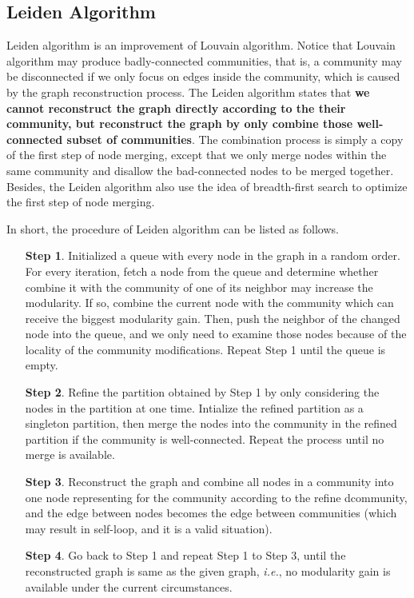 \documentclass[12pt, a4paper]{article}
\theoremstyle{definition}
\begin{document}
\subsection{Leiden Algorithm}
Leiden algorithm is an improvement of Louvain algorithm. Notice that Louvain algorithm may produce badly-connected communities, that is, a community may be disconnected if we only focus on edges inside the community, which is caused by the graph reconstruction process. The Leiden algorithm states that \textbf{we cannot reconstruct the graph directly according to the their community, but reconstruct the graph by only combine those well-connected subset of communities}. The combination process is simply a copy of the first step of node merging, except that we only merge nodes within the same community and disallow the bad-connected nodes to be merged together. Besides, the Leiden algorithm also use the idea of breadth-first search to optimize the first step of node merging.

In short, the procedure of Leiden algorithm can be listed as follows.

\begin{enumerate}
	\item[\textbf{Step 1}.] Initialized a queue with every node in the graph in a random order. For every iteration, fetch a node from the queue and determine whether combine it with the community of one of its neighbor may increase the modularity. If so, combine the current node with the community which can receive the biggest modularity gain. Then, push the neighbor of the changed node into the queue, and we only need to examine those nodes because of the locality of the community modifications. Repeat Step 1 until the queue is empty.
	\item[\textbf{Step 2}.] Refine the partition obtained by Step 1 by only considering the nodes in the partition at one time. Intialize the refined partition as a singleton partition, then merge the nodes into the community in the refined partition if the community is well-connected. Repeat the process until no merge is available.
	\item[\textbf{Step 3}.] Reconstruct the graph and combine all nodes in a community into one node representing for the community according to the refine dcommunity, and the edge between nodes becomes the edge between communities (which may result in self-loop, and it is a valid situation).
	\item[\textbf{Step 4}.] Go back to Step 1 and repeat Step 1 to Step 3, until the reconstructed graph is same as the given graph, \textit{i.e.}, no modularity gain is available under the current circumstances. 
\end{enumerate}
\end{document}
